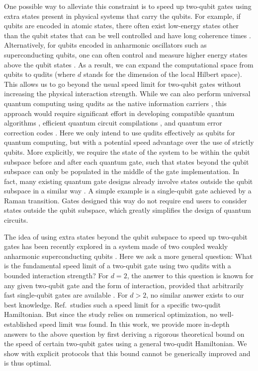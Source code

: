 \documentclass[twocolumn,english,pra,superscriptaddress]{revtex4-1}
\begin{document}
One possible way to alleviate this constraint is to speed up two-qubit gates using extra states present in physical systems that carry the qubits. For example, if qubits are encoded in atomic states, there often exist low-energy states other than the qubit states that can be well controlled and have long coherence times \cite{Low2020qudits,low2023control,Hrmo2023quditcontrol}. Alternatively, for qubits encoded in anharmonic oscillators such as superconducting qubits, one can often control and measure higher energy states above the qubit states \cite{long2021universal,Fisher2023quditransmons,cao2023emulating,FluxmonsCoher}. As a result, we can expand the computational space from qubits to qudits (where $d$ stands for the dimension of the local Hilbert space). This allows us to go beyond the usual speed limit for two-qubit gates \cite{SpeedLim} without increasing the physical interaction strength. While we can also perform universal quantum computing using qudits as the native information carriers \cite{Low2020qudits,Wang_2020,Luo2014qudits,Chi2022qudits,yeh2023scaling,Roy2023scaling}, this approach would require significant effort in developing compatible quantum algorithms \cite{Shors_Algo,Grovers_Algo,HHL}, efficient quantum circuit compilations \cite{Wille2020circcomp,Shan2023circcomp,quetschlich2023compiler}, and quantum error correction codes \cite{Steane_ErrCorrec,Calderbank1996errorcorrec,Roffe_2019}. Here we only intend to use qudits effectively as qubits for quantum computing, but with a potential speed advantage over the use of strictly qubits. More explicitly, we require the state of the system to be within the qubit subspace before and after each quantum gate, such that states beyond the qubit subspace can only be populated in the middle of the gate implementation. In fact, many existing quantum gate designs already involve states outside the qubit subspace in a similar way \cite{Qutrit1,YaleSC2,DRAG}. A simple example is a single-qubit gate achieved by a Raman transition. Gates designed this way do not require end users to consider states outside the qubit subspace, which greatly simplifies the design of quantum circuits.

The idea of using extra states beyond the qubit subspace to speed up two-qubit gates has been recently explored in a system made of two coupled weakly anharmonic superconducting qubits \cite{Ashhab}. Here we ask a more general question: What is the fundamental speed limit of a two-qubit gate using two qudits with a bounded interaction strength? For $d=2$, the answer to this question is known for any given two-qubit gate and the form of interaction, provided that arbitrarily fast single-qubit gates are available \cite{SpeedLim}. For $d>2$, no similar answer exists to our best knowledge. Ref.\,\cite{Ashhab} studies such a speed limit for a specific two-qudit Hamiltonian. But since the study relies on numerical optimization, no well-established speed limit was found. In this work, we provide more in-depth answers to the above question by first deriving a rigorous theoretical bound on the speed of certain two-qubit gates using a general two-qudit Hamiltonian. We show with explicit protocols that this bound cannot be generically improved and is thus optimal. 
\end{document}
